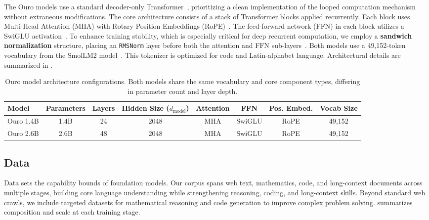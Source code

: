 \documentclass[]{bytedance_seed}
\newcommand{\1}{\mathbf{1}}
\begin{document}
The Ouro models use a standard decoder-only Transformer~\cite{vaswani2017attention}, prioritizing a clean implementation of the looped computation mechanism without extraneous modifications. The core architecture consists of a stack of Transformer blocks applied recurrently. Each block uses Multi-Head Attention (MHA) with Rotary Position Embeddings (RoPE)~\cite{su2023roformerenhancedtransformerrotary}. The feed-forward network (FFN) in each block utilizes a SwiGLU activation~\cite{shazeer2020glu}. To enhance training stability, which is especially critical for deep recurrent computation, we employ a \textbf{sandwich normalization} structure, placing an \texttt{RMSNorm} layer before both the attention and FFN sub-layers~\cite{geiping2025scaling}. 
Both models use a 49,152-token vocabulary from the SmolLM2 model~\cite{allal2025smollm2}. This tokenizer is optimized for code and Latin-alphabet language. Architectural details are summarized in .

\begin{table}[htbp]
\centering
\caption{Ouro model architecture configurations. Both models share the same vocabulary and core component types, differing in parameter count and layer depth.}
\label{tab:model_architecture}
\small %
\begin{tabular}{@{}lccccccc@{}}
\toprule
\textbf{Model} & \textbf{Parameters} & \textbf{Layers} & \textbf{Hidden Size ($d_{\text{model}}$)} & \textbf{Attention} & \textbf{FFN} & \textbf{Pos. Embed.} & \textbf{Vocab Size} \\
\midrule
Ouro 1.4B & 1.4B & 24 & 2048 & MHA & SwiGLU & RoPE & 49,152 \\
Ouro 2.6B & 2.6B & 48 & 2048 & MHA & SwiGLU & RoPE & 49,152 \\
\bottomrule
\end{tabular}
\end{table}


\subsection{Data}
Data sets the capability bounds of foundation models. Our corpus spans web text, mathematics, code, and long-context documents across multiple stages, building core language understanding while strengthening reasoning, coding, and long-context skills. Beyond standard web crawls, we include targeted datasets for mathematical reasoning and code generation to improve complex problem solving.  summarizes composition and scale at each training stage. 
\end{document}
